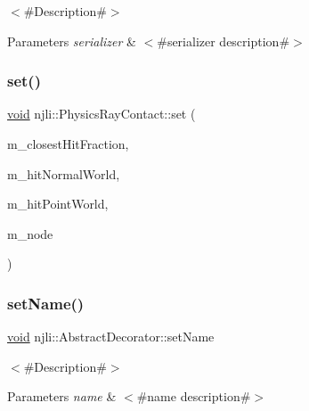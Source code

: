 $<$\#\+Description\#$>$


\begin{DoxyParams}{Parameters}
{\em serializer} & $<$\#serializer description\#$>$ \\
\hline
\end{DoxyParams}
\mbox{\label{classnjli_1_1_physics_ray_contact_ab8995b347efdd2ad6d096dd0a0359977}} 
\subsubsection{\texorpdfstring{set()}{set()}}
{\footnotesize\ttfamily \mbox{\hyperlink{_thread_8h_af1e856da2e658414cb2456cb6f7ebc66}{void}} njli\+::\+Physics\+Ray\+Contact\+::set (\begin{DoxyParamCaption}\item[{\mbox{\hyperlink{_util_8h_a5f6906312a689f27d70e9d086649d3fd}{f32}}}]{m\+\_\+closest\+Hit\+Fraction,  }\item[{const bt\+Vector3 \&}]{m\+\_\+hit\+Normal\+World,  }\item[{const bt\+Vector3 \&}]{m\+\_\+hit\+Point\+World,  }\item[{\mbox{\hyperlink{classnjli_1_1_node}{Node}} $\ast$}]{m\+\_\+node }\end{DoxyParamCaption})\hspace{0.3cm}{\ttfamily [protected]}}

\mbox{\label{classnjli_1_1_physics_ray_contact_a087eb5f8d9f51cc476f12f1d10a3cb95}} 
\subsubsection{\texorpdfstring{set\+Name()}{setName()}}
{\footnotesize\ttfamily \mbox{\hyperlink{_thread_8h_af1e856da2e658414cb2456cb6f7ebc66}{void}} njli\+::\+Abstract\+Decorator\+::set\+Name}

$<$\#\+Description\#$>$


\begin{DoxyParams}{Parameters}
{\em name} & $<$\#name description\#$>$ \\
\hline
\end{DoxyParams}
\mbox{\label{classnjli_1_1_physics_ray_contact_a46bdbc4c8a6f814a98a9f7f72510b513}} 
